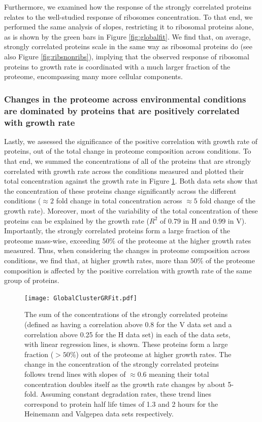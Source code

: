 \documentclass[notitlepage]{article}
\begin{document}
Furthermore, we examined how the response of the strongly correlated proteins relates to the well-studied response of ribosomes concentration.
To that end, we performed the same analysis of slopes, restricting it to ribosomal proteins alone, as is shown by the green bars in Figure \ref{fig:globalfit}.
We find that, on average, strongly correlated proteins scale in the same way as ribosomal proteins do (see also Figure \ref{fig:ribsnonribs}), implying that the observed response of ribosomal proteins to growth rate is coordinated with a much larger fraction of the proteome, encompassing many more cellular components.

\subsubsection{Changes in the proteome across environmental conditions are dominated by proteins that are positively correlated with growth rate}
Lastly, we assessed the significance of the positive correlation with growth rate of proteins, out of the total change in proteome composition across conditions.
To that end, we summed the concentrations of all of the proteins that are strongly correlated with growth rate across the conditions measured and plotted their total concentration against the growth rate in Figure \ref{fig:globalgrcorr}.
Both data sets show that the concentration of these proteins change significantly across the different conditions ($\approx 2$ fold change in total concentration across $\approx 5$ fold change of the growth rate).
Moreover, most of the variability of the total concentration of these proteins can be explained by the growth rate ($R^2$ of $0.79$ in H and $0.99$ in V). 
Importantly, the strongly correlated proteins form a large fraction of the proteome mass-wise, exceeding $50\%$ of the proteome at the higher growth rates measured.
Thus, when considering the changes in proteome composition across conditions, we find that, at higher growth rates, more than $50\%$ of the proteome composition is affected by the positive correlation with growth rate of the same group of proteins.

\begin{figure}[h]
\centering
\texttt{[image: GlobalClusterGRFit.pdf]}
\caption{
The sum of the concentrations of the strongly correlated proteins (defined as having a correlation above 0.8 for the V data set and a correlation above 0.25 for the H data set) in each of the data sets, with linear regression lines, is shown.
These proteins form a large fraction ($>50\%$) out of the proteome at higher growth rates.
The change in the concentration of the strongly correlated proteins follows trend lines with slopes of $\approx 0.6$ meaning their total concentration doubles itself as the growth rate changes by about 5-fold.
Assuming constant degradation rates, these trend lines correspond to protein half life times of 1.3 and 2 hours for the Heinemann and Valgepea data sets respectively.
}
\label{fig:globalgrcorr}
\end{figure}
\end{document}
